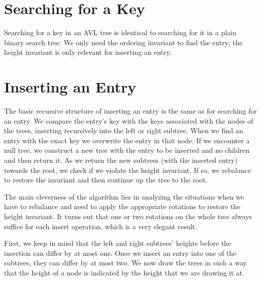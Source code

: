 \section{Searching for a Key}
\label{sec:avl:searching}

Searching for a key in an AVL tree is identical to searching for it in a plain
binary search tree.  We only need the ordering invariant to find the entry;
the height invariant is only relevant for inserting an entry.


\section{Inserting an Entry}
\label{sec:avl:inserting}

The basic recursive structure of inserting an entry is the same as
for searching for an entry.  We compare the entry's key with the
keys associated with the nodes of the trees, inserting recursively
into the left or right subtree.  When we find an entry with the
exact key we overwrite the entry in that node.  If we encounter a
null tree, we construct a new tree with the entry to be inserted and
no children and then return it.  As we return the new subtrees (with
the inserted entry) towards the root, we check if we violate the
height invariant.  If so, we rebalance to restore the invariant and
then continue up the tree to the root.

The main cleverness of the algorithm lies in analyzing the situations
when we have to rebalance and need to apply the appropriate rotations to
restore the height invariant.  It turns out that one or two rotations
on the whole tree always suffice for each insert operation, which is
a very elegant result.

First, we keep in mind that the left and right subtrees' heights
before the insertion can differ by at most one.  Once we insert an
entry into one of the subtrees, they can differ by at most two.  We
now draw the trees in such a way that the height of a node is
indicated by the height that we are drawing it at.

